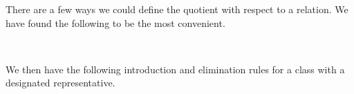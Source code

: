 \documentclass[a4paper,UKenglish,cleveref,autoref,thm-restate]{lipics-v2021}
\begin{document}
\ccpad
There are a few ways we could define the quotient with respect to a relation. We have found the following to be the most convenient.
\ccpad
\begin{code}%
\>[1]\AgdaOperator{\AgdaFunction{\AgdaUnderscore{}/\AgdaUnderscore{}}}\AgdaSpace{}%
\AgdaSymbol{:}\AgdaSpace{}%
\AgdaSymbol{(}\AgdaSpace{}%
\AgdaSymbol{:}\AgdaSpace{}%
\AgdaSpace{}%
\AgdaSpace{}%
\AgdaSymbol{)}\AgdaSpace{}%
\AgdaSpace{}%
\AgdaSpace{}%
\AgdaSpace{}%
\AgdaSpace{}%
\AgdaSpace{}%
\AgdaSpace{}%
\AgdaSpace{}%
\AgdaSymbol{(}\AgdaSpace{}%
\AgdaSymbol{)}\AgdaSpace{}%
\<%
\\
%
\>[1]\AgdaSpace{}%
\AgdaOperator{\AgdaFunction{/}}\AgdaSpace{}%
\AgdaSpace{}%
\AgdaSymbol{=}\AgdaSpace{}%
\AgdaSpace{}%
\AgdaSpace{}%
\AgdaSpace{}%
\AgdaSpace{}%
\AgdaSpace{}%
\AgdaSpace{}%
\AgdaFunction{,}%
\>[27]\AgdaSymbol{\{}\AgdaSymbol{\}\{}\AgdaSymbol{\}}\AgdaSpace{}%
\<%
\end{code}
\ccpad
We then have the following introduction and elimination rules for a class with a designated representative.
\ccpad
\begin{code}%
\>[0][@{}l@{\AgdaIndent{1}}]%
\>[1]\AgdaSpace{}%
\AgdaSymbol{:}\AgdaSpace{}%
\AgdaSymbol{\{}\AgdaSpace{}%
\AgdaSymbol{:}\AgdaSpace{}%
\AgdaSpace{}%
\AgdaSymbol{\}}\AgdaSpace{}%
\AgdaSpace{}%
\AgdaSpace{}%
\AgdaSpace{}%
\AgdaSymbol{\{}\AgdaSpace{}%
\AgdaSymbol{:}\AgdaSpace{}%
\AgdaSpace{}%
\AgdaSpace{}%
\AgdaSymbol{\}}\AgdaSpace{}%
\AgdaSpace{}%
\AgdaSpace{}%
\AgdaOperator{\AgdaFunction{/}}\AgdaSpace{}%
\<%
\\
%
\>[1]\AgdaSpace{}%
\AgdaSpace{}%
\AgdaSpace{}%
\AgdaSymbol{\{}\AgdaSymbol{\}}\AgdaSpace{}%
\AgdaSymbol{=}\AgdaSpace{}%
\AgdaSymbol{(}\AgdaOperator{\AgdaFunction{[}}\AgdaSpace{}%
\AgdaSpace{}%
\AgdaOperator{\AgdaFunction{]}}\AgdaSpace{}%
\AgdaSymbol{)}\AgdaSpace{}%
\AgdaOperator{\AgdaInductiveConstructor{,}}\AgdaSpace{}%
\AgdaSpace{}%
\AgdaOperator{\AgdaInductiveConstructor{,}}\AgdaSpace{}%
\<%
\end{code}
\end{document}
